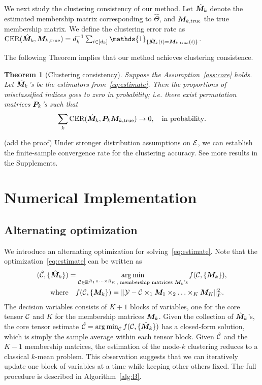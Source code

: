 \documentclass{article}
\newtheorem{theorem}{Theorem}
\begin{document}
We next study the clustering consistency of our method. Let $\hat {\bm M}_k$ denote the estimated membership matrix corresponding to $\hat\Theta$, and $\bm M_{k,\text{true}}$ the true membership matrix. We define the clustering error rate as $\text{CER}(\hat \mM_k, \trueM)=d_k^{-1}\sum_{i\in[d_k]}\mathds{1}_{\{\hat \mM_k(i)=\trueM(i)\}}$. 

The following Theorem implies that our method achieves clustering consistence. 
\begin{theorem}[Clustering consistency]\label{thm:partition}
Suppose the Assumption~\eqref{ass:core} holds. Let $\hat {\bm M}_k$'s be the estimators from~\eqref{eq:estimate}. Then the proportions of misclassified indices goes to zero in probability; i.e. there exist permutation matrices $\bm{P}_k$'s such that
\[
\sum_k \text{CER}(\hat {\bm M}_k, \bm{P}_k\bm M_{k,\text{true}}) \rightarrow 0, \quad \text{in probability}. 
\]
\end{theorem}
(add the proof)
Under stronger distribution assumptions on $\mathcal{E}$, we can establish the finite-sample convergence rate for the clustering accuracy. See more results in the Supplements. 

\section{Numerical Implementation}
\subsection{Alternating optimization}
We introduce an alternating optimization for solving~\eqref{eq:estimate}. Note that the optimization~\eqref{eq:estimate} can be written as
\begin{align}\label{eq:op}
(\hat {\mathcal{C}}, \{\hat {\bm M}_k\})&=\operatorname*{arg\,min}_{\mathcal{C}\in\mathbb{R}^{R_1\times \cdots \times R_K}, \text{ membership matrices $\bm M_k$'s}} f(\mathcal{C},\{\bm M_k\}),\notag\\
 \text{where}&\quad f(\mathcal{C},\{\bm M_k\})=\lVert\mathcal{Y}-\mathcal{C}\times_1\bm M_1\times_2\ldots\times_K\bm M_K\rVert_F^2.\notag
\end{align}
The decision variables consists of $K+1$ blocks of variables, one for the core tensor $\mathcal{C}$ and $K$ for the membership matrices $\bm M_k$. Given the collection of $\hat {\bm M}_k$'s, the core tensor estimate $\hat {\mathcal{C}}=\operatorname*{arg\,min}_{\mathcal{C}}f(\mathcal{C},\{\hat {\bm M}_k\})$ has a closed-form solution, which is simply the sample average within each tensor block. Given $\hat {\mathcal{C}}$ and the $K-1$ membership matrices, the estimation of the mode-$k$ clustering reduces to a classical $k$-mean problem. This observation suggests that we can iteratively update one block of variables at a time while keeping other others fixed. The full procedure is described in Algorithm~\ref{alg:B}.
\end{document}
